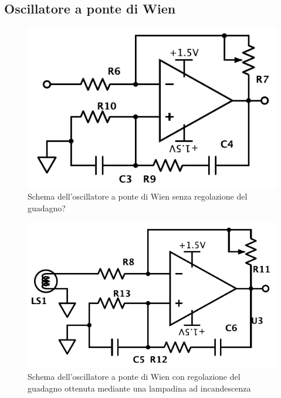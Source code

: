 \subsection{Oscillatore a ponte di Wien}

\begin{figure}
\centering
\includegraphics[width=.35\textwidth]{../E08/latex/osc.pdf}
\caption{Schema dell'oscillatore a ponte di Wien senza regolazione del guadagno?}
\label{cir8:without_lamp}
\end{figure}

\begin{figure}
\centering
\includegraphics[width=.35\textwidth]{../E08/latex/osc_w_lamp.pdf}
\caption{Schema dell'oscillatore a ponte di Wien con regolazione del guadagno ottenuta mediante una lampadina ad incandescenza}
\label{cir8:with_lamp}
\end{figure}
